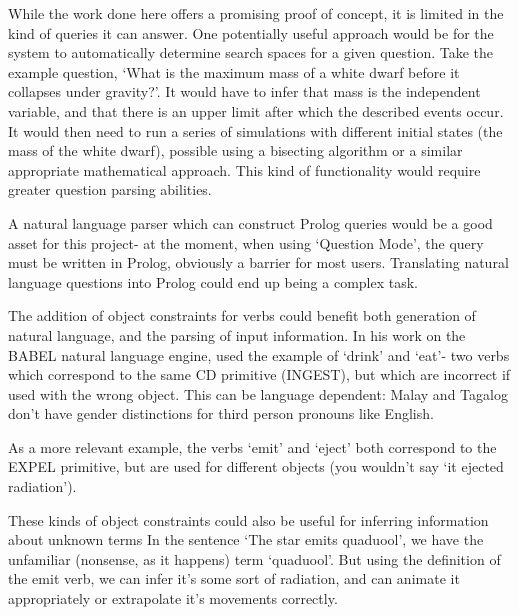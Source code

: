 \documentclass[12pt,MSc,wordcount,twoside]{muthesis}
\begin{document}
    While the work done here offers a promising proof of concept, it is limited in the kind of queries it can answer. One potentially useful approach would be for the system to automatically determine search spaces for a given question. Take the example question, `What is the maximum mass of a white dwarf before it collapses under gravity?'. It would have to infer that mass is the independent variable, and that there is an upper limit after which the described events occur. It would then need to run a series of simulations with different initial states (the mass of the white dwarf), possible using a bisecting algorithm or a similar appropriate mathematical approach. This kind of functionality would require greater question parsing abilities.

    A natural language parser which can construct Prolog queries would be a good asset for this project- at the moment, when using `Question Mode', the query must be written in Prolog, obviously a barrier for most users. Translating natural language questions into Prolog could end up being a complex task.

    The addition of object constraints for verbs could benefit both generation of natural language, and the parsing of input information. In his work on the BABEL natural language engine, \citeauthor{GOLDMAN1975289} used the example of `drink' and `eat'- two verbs which correspond to the same CD primitive (INGEST), but which are incorrect if used with the wrong object. This can be language dependent: Malay and Tagalog don't have gender distinctions for third person pronouns like English.

    As a more relevant example, the verbs `emit' and `eject' both correspond to the EXPEL primitive, but are used for different objects (you wouldn't say `it ejected radiation').

    These kinds of object constraints could also be useful for inferring information about unknown terms In the sentence `The star emits quaduool', we have the unfamiliar (nonsense, as it happens) term `quaduool'. But using the definition of the emit verb, we can infer it's some sort of radiation, and can animate it appropriately or extrapolate it's movements correctly.

    
    
\end{document}
